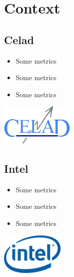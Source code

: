 %
%

\section{Context}

\subsection{Celad}
\begin{FrameWithSubSection}
    \begin{minipage}{0.49\textwidth}
        \begin{itemize}
            \item Some metrics
            \item Some metrics
            \item Some metrics
        \end{itemize}
    \end{minipage}
    \begin{minipage}{0.49\textwidth}
        \flushright
        \includegraphics[height=2cm]{../../report/src/img/logocelad.jpg}
    \end{minipage}
\end{FrameWithSubSection}

\subsection{Intel}
\begin{FrameWithSubSection}
    \begin{minipage}{0.49\textwidth}
        \begin{itemize}
            \item Some metrics
            \item Some metrics
            \item Some metrics
        \end{itemize}
    \end{minipage}
    \begin{minipage}{0.49\textwidth}
        \flushright
        \includegraphics[height=2cm]{../../report/src/img/logointel.jpg}
    \end{minipage}
\end{FrameWithSubSection}

